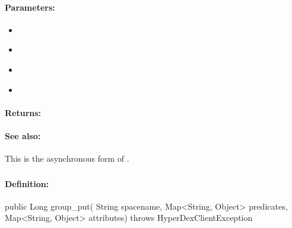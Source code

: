 \paragraph{Parameters:}
\begin{itemize}[noitemsep]
\item {}\\

\item {}\\

\item {}\\

\item {}\\

\end{itemize}

\paragraph{Returns:}


\paragraph{See also:}  This is the asynchronous form of .

\pagebreak
\subsubsection{}
\label{api:java:group_put}


\paragraph{Definition:}
\begin{javacode}
public Long group_put(
        String spacename,
        Map<String, Object> predicates,
        Map<String, Object> attributes) throws HyperDexClientException
\end{javacode}

